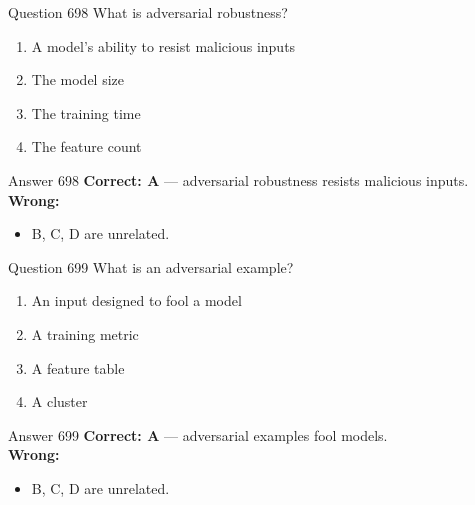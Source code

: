 \documentclass[aspectratio=169,11pt]{beamer}
\begin{document}
	\begin{frame}{Question 698}
		What is adversarial robustness?
		\begin{enumerate}[label=\Alph*.]
			\item A model's ability to resist malicious inputs
			\item The model size
			\item The training time
			\item The feature count
		\end{enumerate}
	\end{frame}
	\begin{frame}{Answer 698}
		\textbf{Correct: A} --- adversarial robustness resists malicious inputs.\\
		\vspace{0.5em}
		\textbf{Wrong:}
		\begin{itemize}
			\item B, C, D are unrelated.
		\end{itemize}
	\end{frame}
	
	\begin{frame}{Question 699}
		What is an adversarial example?
		\begin{enumerate}[label=\Alph*.]
			\item An input designed to fool a model
			\item A training metric
			\item A feature table
			\item A cluster
		\end{enumerate}
	\end{frame}
	\begin{frame}{Answer 699}
		\textbf{Correct: A} --- adversarial examples fool models.\\
		\vspace{0.5em}
		\textbf{Wrong:}
		\begin{itemize}
			\item B, C, D are unrelated.
		\end{itemize}
	\end{frame}
	
\end{document}
